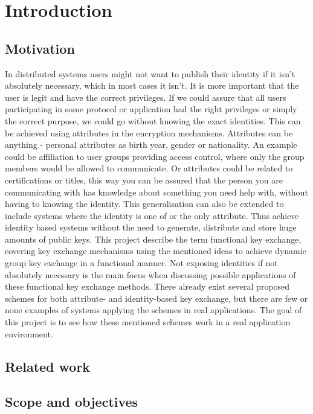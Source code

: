 \chapter{Introduction}
\label{chp:intro} 
\section{Motivation}
In distributed systems users might not want to publish their identity if it isn't absolutely necessary, which in most cases it isn't. It is more important that the user is legit and have the correct privileges. If we could assure that all users participating in some protocol or application had the right privileges or simply the correct purpose, we could go without knowing the exact identities. This can be achieved using attributes in the encryption mechanisms. Attributes can be anything - personal attributes as birth year, gender or nationality. An example could be affiliation to user groups providing access control, where only the group members would be allowed to communicate. Or attributes could be related to certifications or titles, this way you can be assured that the person you are communicating with has knowledge about something you need help with, without having to knowing the identity. This generalisation can also be extended to include systems where the identity is one of or the only attribute. Thus achieve identity based systems without the need to generate, distribute and store huge amounts of public keys. This project describe the term functional key exchange, covering key exchange mechanisms using the mentioned ideas to achieve dynamic group key exchange in a functional manner. Not exposing identities if not absolutely necessary is the main focus when discussing possible applications of these functional key exchange methods. There already exist several proposed schemes for both attribute- and identity-based key exchange, but there are few or none examples of systems applying the schemes in real applications. The goal of this project is to see how these mentioned schemes work in a real application environment.

\section{Related work}\label{sec:related_work}


\section{Scope and objectives}\label{sec:scope}

